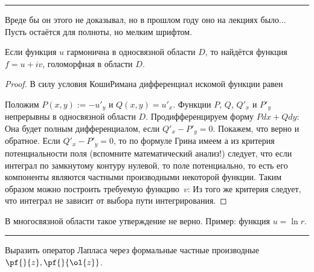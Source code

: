 \documentclass[a4paper]{article}
\newenvironment{petit}
{\par \smallskip \hrule \smallskip \footnotesize}
{\par \smallskip \hrule \smallskip}
\begin{document}
\begin{petit}
Вреде бы он этого не доказывал, но в прошлом году оно на лекциях было... Пусть остаётся для полноты, но мелким шрифтом.

\medskip

\begin{stm}
Если функция $u$ гармонична в односвязной области $D$, то найдётся функция $f = u + iv$, голоморфная в области $D$.
\end{stm}
\begin{proof}
В силу условия Коши\ч Римана дифференциал искомой функции равен

Положим $P(x,y):= -u'_y$ и $Q(x,y)=u'_x$. Функции $P$, $Q$, $Q'_x$ и $P'_y$ непрерывны в
односвязной области $D$. Продифференцируем форму $Pdx + Qdy$:
Она будет полным дифференциалом, если $Q'_x - P'_y = 0$. Покажем, что верно и обратное.
Если $Q'_x - P'_y = 0$, то по формуле Грина имеем
а из критерия потенциальности поля (вспомните математический анализ!) следует, что
если интеграл по замкнутому контуру нулевой, то поле потенциально, то есть его компоненты
являются частными производными некоторой функции. Таким образом можно построить требуемую функцию~$v$:
Из того же критерия следует, что интеграл не зависит от выбора пути интегрирования.
\end{proof}

\begin{note}
В многосвязной области такое утверждение не верно. Пример: функция $u = \ln r$.
\end{note}
\end{petit}

\begin{problem}
Выразить оператор Лапласа через формальные частные производные $\pf{}{z},\pf{}{\ol{z}}$.
\end{problem}
\end{document}
